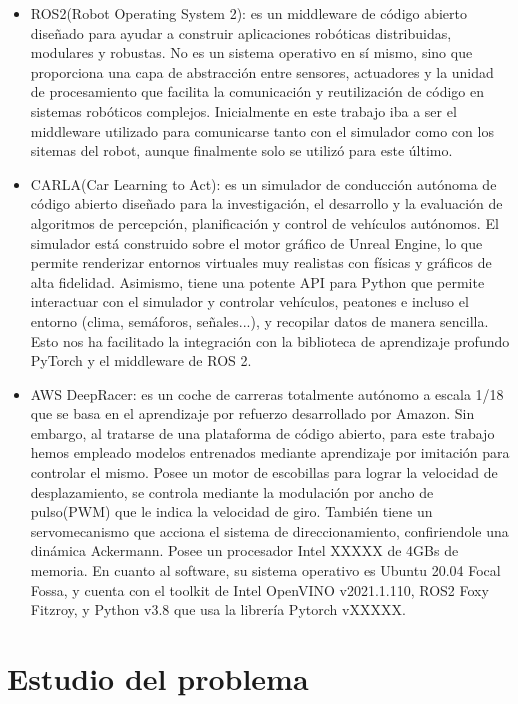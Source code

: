 \documentclass[12pt,a4paper,onecolumn,oneside]{report}
\begin{document}
\begin{itemize}
\item ROS2(Robot Operating System 2): es un middleware de código abierto diseñado para ayudar a construir aplicaciones robóticas distribuidas, modulares y robustas. No es un sistema operativo en sí mismo, sino que proporciona una capa de abstracción entre sensores, actuadores y la unidad de procesamiento que facilita la comunicación y reutilización de código en sistemas robóticos complejos. Inicialmente en este trabajo iba a ser el middleware utilizado para comunicarse tanto con el simulador como con los sitemas del robot, aunque finalmente solo se utilizó para este último.

\item CARLA(Car Learning to Act): es un simulador de conducción autónoma de código abierto diseñado para la investigación, el desarrollo y la evaluación de algoritmos de percepción, planificación y control de vehículos autónomos. El simulador está construido sobre el motor gráfico de Unreal Engine, lo que permite renderizar entornos virtuales muy realistas con físicas y gráficos de alta fidelidad. Asimismo, tiene una potente API para Python que permite interactuar con el simulador y controlar vehículos, peatones e incluso el entorno (clima, semáforos, señales...), y recopilar datos de manera sencilla. Esto nos ha facilitado la integración con la biblioteca de aprendizaje profundo PyTorch y el middleware de ROS 2.

\item AWS DeepRacer: es un coche de carreras totalmente autónomo a escala 1/18 que se basa en el aprendizaje por refuerzo desarrollado por Amazon. Sin embargo, al tratarse de una plataforma de código abierto, para este trabajo hemos empleado modelos entrenados mediante aprendizaje por imitación para controlar el mismo. Posee un motor de escobillas para lograr la velocidad de desplazamiento, se controla mediante la modulación por ancho de pulso(PWM) que le indica la velocidad de giro. También tiene un servomecanismo que acciona el sistema de direccionamiento, confiriendole una dinámica Ackermann. Posee un procesador Intel XXXXX de 4GBs de memoria. En cuanto al software, su sistema operativo es Ubuntu 20.04 Focal Fossa, y cuenta con el toolkit de Intel OpenVINO v2021.1.110, ROS2 Foxy Fitzroy, y Python v3.8 que usa la librería Pytorch vXXXXX. 

\end{itemize}

\chapter{Estudio del problema}
\label{Estudio del problema}
\end{document}
